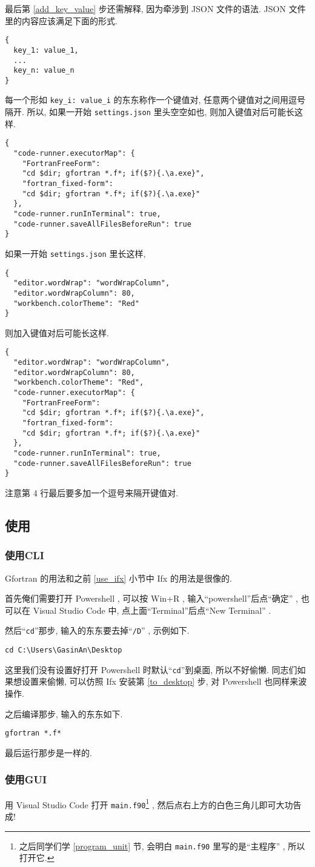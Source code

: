 最后第 \ref{add_key_value} 步还需解释, 因为牵涉到 JSON 文件的语法. JSON 文件里的内容应该满足下面的形式.
\begin{verbatim}
{
  key_1: value_1,
  ...
  key_n: value_n
}
\end{verbatim}
每一个形如 \texttt{key\_{}i: value\_{}i} 的东东称作一个键值对, 任意两个键值对之间用逗号隔开. 所以, 如果一开始 \texttt{settings.json} 里头空空如也, 则加入键值对后可能长这样.
\begin{verbatim}
{
  "code-runner.executorMap": {
    "FortranFreeForm":
    "cd $dir; gfortran *.f*; if($?){.\a.exe}",
    "fortran_fixed-form":
    "cd $dir; gfortran *.f*; if($?){.\a.exe}"
  },
  "code-runner.runInTerminal": true,
  "code-runner.saveAllFilesBeforeRun": true
}
\end{verbatim}
如果一开始 \texttt{settings.json} 里长这样,
\begin{lstlisting}
{
  "editor.wordWrap": "wordWrapColumn",
  "editor.wordWrapColumn": 80,
  "workbench.colorTheme": "Red"
}
\end{lstlisting}
则加入键值对后可能长这样.
\begin{lstlisting}
{
  "editor.wordWrap": "wordWrapColumn",
  "editor.wordWrapColumn": 80,
  "workbench.colorTheme": "Red",
  "code-runner.executorMap": {
    "FortranFreeForm":
    "cd $dir; gfortran *.f*; if($?){.\a.exe}",
    "fortran_fixed-form":
    "cd $dir; gfortran *.f*; if($?){.\a.exe}"
  },
  "code-runner.runInTerminal": true,
  "code-runner.saveAllFilesBeforeRun": true
}
\end{lstlisting}
注意第 4 行最后要多加一个逗号来隔开键值对.

\subsection{使用}\label{use_gfortran}

\subsubsection{使用CLI}

Gfortran 的用法和之前 \ref{use_ifx} 小节中 Ifx 的用法是很像的.

首先俺们需要打开 Powershell , 可以按 Win+R , 输入``powershell''后点``确定'' , 也可以在 Visual Studio Code 中, 点上面``Terminal''后点``New Terminal'' .

然后``\texttt{cd}''那步, 输入的东东要去掉``\texttt{/D}'' , 示例如下.
\begin{verbatim}
cd C:\Users\GasinAn\Desktop
\end{verbatim}
这里我们没有设置好打开 Powershell 时默认``\texttt{cd}''到桌面, 所以不好偷懒. 同志们如果想设置来偷懒, 可以仿照 Ifx 安装第 \ref{to_desktop} 步, 对 Powershell 也同样来波操作.

之后编译那步, 输入的东东如下.
\begin{verbatim}
gfortran *.f*
\end{verbatim}

最后运行那步是一样的.

\subsubsection{使用GUI}

用 Visual Studio Code 打开 \texttt{main.f90}\footnote{之后同学们学 \ref{program_unit} 节, 会明白 \texttt{main.f90} 里写的是``主程序'' , 所以打开它.} , 然后点右上方的白色三角儿即可大功告成!
